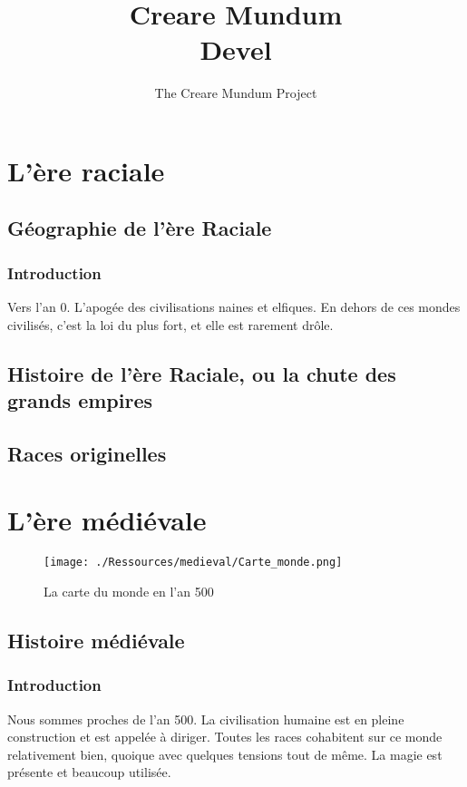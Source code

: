 \documentclass{book}
\title{Creare Mundum \\ Devel}
\author{The Creare Mundum Project}
\date{\oldstylenums{\insertdate}}
\makeatletter
\newcommand{\partimage}[2][]{\gdef\@partimage{\texttt{[image: \#2]}}}
\makeatother
\begin{document}
\maketitle
\setcounter{tocdepth}{2} %
\renewcommand{\contentsname}{Sommaire} 
\tableofcontents

\partimage[scale=0.4]{./Ressources/racial/os.jpg}
\part{L'ère raciale}
\chapter{Géographie de l'ère Raciale}
\section{Introduction}
Vers l'an 0. L'apogée des civilisations naines et elfiques. En dehors de ces mondes civilisés, c'est la loi du plus fort, et elle est rarement drôle.


\chapter{Histoire de l'ère Raciale, ou la chute des grands empires}

\chapter{Races originelles}


\partimage[scale=0.2]{./Ressources/medieval/roue.jpg}
\part{L'ère médiévale}
\begin{figure}
\begin{center}
\hypertarget{cartedumonde}{}
\texttt{[image: ./Ressources/medieval/Carte\_monde.png]}
\caption{La carte du monde en l'an 500}
\end{center}
\end{figure}
\chapter{Histoire médiévale}
\section{Introduction}
Nous sommes proches de l'an 500. La civilisation humaine est en pleine construction et est appelée à diriger.
Toutes les races cohabitent sur ce monde relativement bien, quoique avec quelques tensions tout de même.
La magie est présente et beaucoup utilisée.

\end{document}
